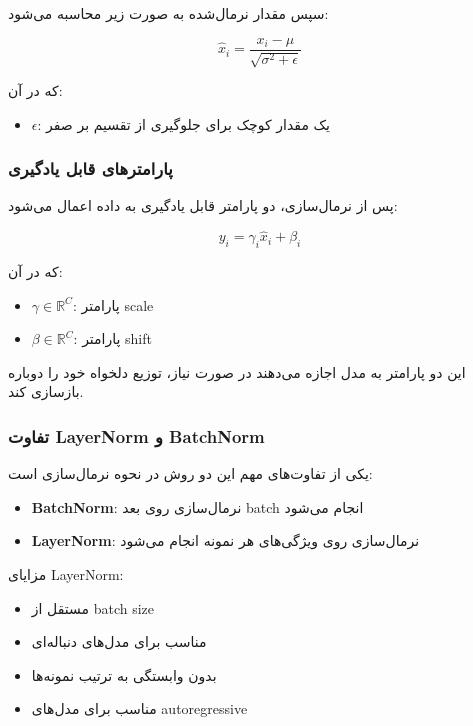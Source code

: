 \documentclass{article}
\begin{document}
سپس مقدار نرمال‌شده به صورت زیر محاسبه می‌شود:

\[
\hat{x}_i = \frac{x_i - \mu}{\sqrt{\sigma^2 + \epsilon}}
\]

که در آن:

\begin{itemize}
	\item \( \epsilon \): یک مقدار کوچک برای جلوگیری از تقسیم بر صفر
\end{itemize}

\subsubsection*{پارامترهای قابل یادگیری}

پس از نرمال‌سازی، دو پارامتر قابل یادگیری به داده اعمال می‌شود:

\[
y_i = \gamma_i \hat{x}_i + \beta_i
\]

که در آن:

\begin{itemize}
	\item \( \gamma \in \mathbb{R}^{C} \): پارامتر scale
	\item \( \beta \in \mathbb{R}^{C} \): پارامتر shift
\end{itemize}

این دو پارامتر به مدل اجازه می‌دهند در صورت نیاز، توزیع دلخواه خود را دوباره بازسازی کند.

\subsubsection*{تفاوت LayerNorm و BatchNorm}

یکی از تفاوت‌های مهم این دو روش در نحوه نرمال‌سازی است:

\begin{itemize}
	\item \textbf{BatchNorm}: نرمال‌سازی روی بعد batch انجام می‌شود
	\item \textbf{LayerNorm}: نرمال‌سازی روی ویژگی‌های هر نمونه انجام می‌شود
\end{itemize}

مزایای LayerNorm:

\begin{itemize}
	\item مستقل از batch size
	\item مناسب برای مدل‌های دنباله‌ای
	\item بدون وابستگی به ترتیب نمونه‌ها
	\item مناسب برای مدل‌های autoregressive
\end{itemize}
\end{document}
